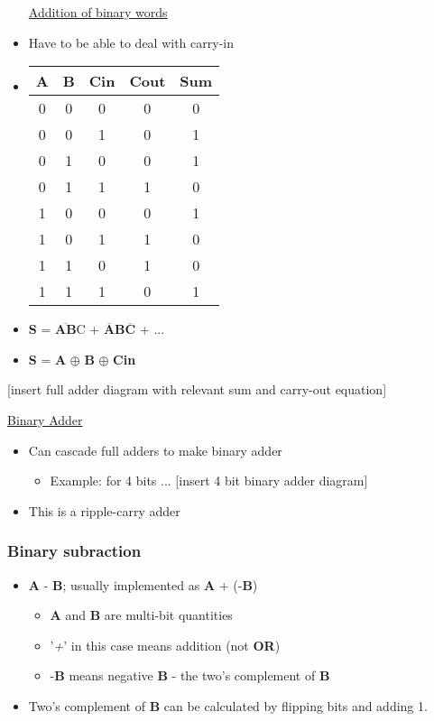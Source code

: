 \documentclass{article}
\begin{document}
\begin{itemize}
\underline{Addition of binary words}

\item Have to be able to deal with carry-in
\item 
\begin{tabular}{ c c c c c }
A & B & Cin & Cout & Sum \\ 
\hline
 0 & 0 & 0 & 0 & 0 \\  
 0 & 0 & 1 & 0 & 1 \\  
 0 & 1 & 0 & 0 & 1 \\  
 0 & 1 & 1 & 1 & 0 \\  
 1 & 0 & 0 & 0 & 1 \\  
 1 & 0 & 1 & 1 & 0 \\   
 1 & 1 & 0 & 1 & 0 \\  
 1 & 1 & 1 & 0 & 1 \\   
\end{tabular}
\item \textbf{S} = $\overline{\textbf{AB}}$C + $\overline{\textbf{A}}$\textbf{B}$\overline{\textbf{C}}$ + ...
\item \textbf{S} = \textbf{A} $\oplus$ \textbf{B} $\oplus$ \textbf{Cin}
\end{itemize}


[insert full adder diagram with relevant sum and carry-out equation]

\underline{Binary Adder}
\begin{itemize}
\item Can cascade full adders to make binary adder
\begin{itemize}
\item Example: for 4 bits ...
[insert 4 bit binary adder diagram]
\end{itemize}
\item This is a ripple-carry adder
\end{itemize}

\subsubsection{Binary subraction}
\begin{itemize}
\item \textbf{A} - \textbf{B}; usually implemented as \textbf{A} + (-\textbf{B})
\begin{itemize}
\item \textbf{A} and \textbf{B} are multi-bit quantities
\item '\textit{+}' in this case means addition (not \textbf{OR})
\item -\textbf{B} means negative \textbf{B} - the two's complement of \textbf{B}
\end{itemize}
\item Two's complement of \textbf{B} can be calculated by flipping bits and adding 1.
\end{itemize}
\end{document}
